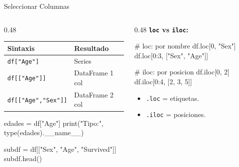 \documentclass[aspectratio=169, 11pt]{beamer}
\begin{document}
\begin{frame}[fragile,shrink=28]{Seleccionar Columnas}
  \vspace{-6pt}
  \begin{columns}[T]
    \begin{column}{0.48\textwidth}
      {\scriptsize
      \begin{tabular}{@{}ll@{}}
        \toprule
        \textbf{Sintaxis} & \textbf{Resultado} \\
        \midrule
        \texttt{df["Age"]}        & Series \\
        \texttt{df[["Age"]]}      & DataFrame 1 col \\
        \texttt{df[["Age","Sex"]]} & DataFrame 2 col \\
        \bottomrule
      \end{tabular}
      }

      \vspace{6pt}
      \begin{pyblock}[minted options={fontsize=\scriptsize, breaklines}]
edades = df["Age"]
print("Tipo:", type(edades).__name__)

subdf = df[["Sex", "Age", "Survived"]]
subdf.head()
      \end{pyblock}
    \end{column}

    \begin{column}{0.48\textwidth}
      {\scriptsize\color{arcaDark}\bfseries \texttt{loc} vs \texttt{iloc}:}
      \vspace{2pt}

      \begin{pyblock}[minted options={fontsize=\scriptsize, breaklines}]
# loc: por nombre
df.loc[0, "Sex"]
df.loc[0:3, ["Sex", "Age"]]

# iloc: por posicion
df.iloc[0, 2]
df.iloc[0:4, [2, 3, 5]]
      \end{pyblock}

      \vspace{2pt}
      {\scriptsize\color{textMuted}
      \begin{itemize}\setlength{\itemsep}{2pt}
        \item[{\color{arcaRed}\scriptsize\faArrowRight}]
          \texttt{.loc} = etiquetas.
        \item[{\color{arcaRed}\scriptsize\faArrowRight}]
          \texttt{.iloc} = posiciones.
      \end{itemize}
      }
    \end{column}
  \end{columns}
\end{frame}
\end{document}
